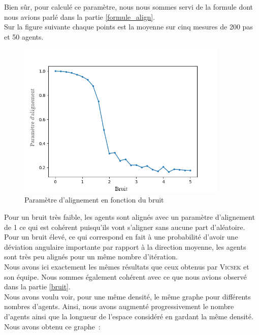 \documentclass[french, a4paper, 12pt, openany]{report}
\begin{document}
	Bien sûr, pour calculé ce paramètre, nous nous sommes servi de la formule dont nous avions parlé dans la partie \ref{formule_align}.\\
	
	Sur la figure suivante chaque points est la moyenne sur cinq mesures de 200 pas et 50 agents.
	\begin{figure}[!h]
		\centering
		\includegraphics[width=10cm]{images/bruit_4bis.png}
		\caption{Paramètre d'alignement en fonction du bruit}
		\label{param_bruit}
	\end{figure}
	
	\newpage
	Pour un bruit très faible, les agents sont alignés avec un paramètre d'alignement de 1 ce qui est cohérent puisqu'ils vont s'aligner sans aucune part d'aléatoire. Pour un bruit élevé, ce qui correspond en fait à une probabilité d'avoir une déviation angulaire importante par rapport à la direction moyenne, les agents sont très peu alignés pour un même nombre d'itération. \\
	
	Nous avons ici exactement les mêmes résultats que ceux obtenus par \textsc{Vicsek} et son équipe. Nous sommes également cohérent avec ce que nous avions observé dans la partie \ref{bruit}.\\
	
	Nous avons voulu voir, pour une même densité, le même graphe pour différents nombres d'agents. Ainsi, nous avons augmenté progressivement le nombre d'agents ainsi que la longueur de l'espace considéré en gardant la même densité. Nous avons obtenu ce graphe~:
	
\end{document}
